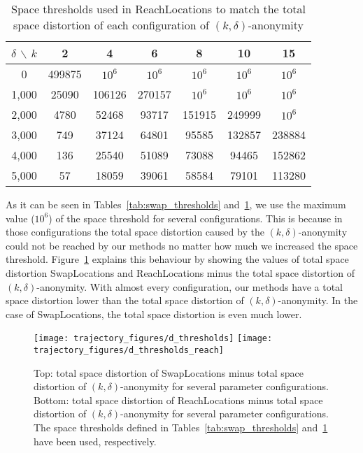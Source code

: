 \begin{table}[!ht]
\centering
\begin{tabular}{|c|c|c|c|c|c|c|}
\hline
$\delta$ $\backslash$ $k$ & 2 & 4 & 6 & 8 & 10 & 15 \\
\hline
0 & 499875 & $10^6$ & $10^6$ & $10^6$ & $10^6$ & $10^6$ \\
1,000 & 25090 & 106126 & 270157 & $10^6$ & $10^6$ & $10^6$ \\
2,000 & 4780 & 52468 & 93717 & 151915 & 249999 & $10^6$ \\
3,000 & 749 & 37124 & 64801 & 95585 & 132857 & 238884 \\
4,000 & 136 & 25540 & 51089 & 73088 & 94465 & 152862 \\
5,000 & 57 & 18059 & 39061 & 58584 & 79101 & 113280 \\
\hline
\end{tabular}
\caption{Space thresholds used in ReachLocations to match
the total space distortion of each configuration of $(k, \delta)$-anonymity}
\label{tab:reach_thresholds}
\end{table}

As it can be seen in Tables~\ref{tab:swap_thresholds}
and~\ref{tab:reach_thresholds}, we use the maximum value ($10^6$) of
the space threshold for several configurations. This is because in those
configurations
the total space distortion caused by the $(k, \delta)$-anonymity
could not be reached by our methods no matter how much we increased
the space threshold.
Figure~\ref{fig:trashed} explains this behaviour by showing
the values of total space distortion SwapLocations
and ReachLocations minus the total space distortion of $(k, \delta)$-anonymity.
With almost every configuration, our methods have a total space
distortion lower than the total space distortion of
$(k, \delta)$-anonymity. In the case of SwapLocations,
the total space distortion is even much lower.

\begin{figure}[!ht]
\centering
\texttt{[image: trajectory\_figures/d\_thresholds]}
\texttt{[image: trajectory\_figures/d\_thresholds\_reach]}
\caption{Top: total space distortion of SwapLocations minus
total space distortion of $(k, \delta)$-anonymity
for several parameter configurations.
Bottom: total space distortion of ReachLocations minus
total space distortion of $(k, \delta)$-anonymity
for several parameter configurations.
The space thresholds defined in Tables~\ref{tab:swap_thresholds}
  and~\ref{tab:reach_thresholds} have been used, respectively.}
\label{fig:trashed}
\end{figure}

